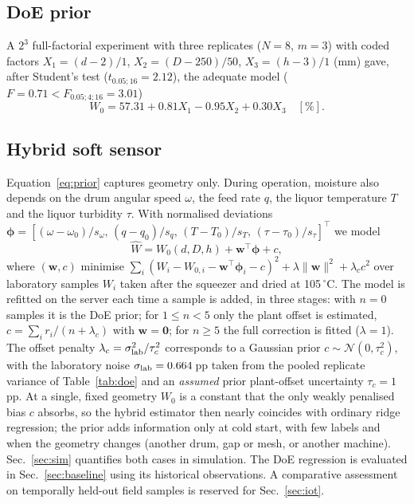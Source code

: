 \documentclass[journal]{IEEEtran}
\begin{document}
\subsection{DoE prior}
A $2^3$ full-factorial experiment with three replicates ($N=8$, $m=3$) with coded factors
$X_1=(d-2)/1$, $X_2=(D-250)/50$, $X_3=(h-3)/1$ (mm) gave, after Student's test ($t_{0.05;16}=2.12$), the adequate model
($F=0.71<F_{0.05;4;16}=3.01$)
\begin{equation}
W_0 = 57.31 + 0.81X_1 - 0.95X_2 + 0.30X_3 \quad [\%].
\label{eq:prior}
\end{equation}

\subsection{Hybrid soft sensor}
\label{sec:hybrid}
Equation~\eqref{eq:prior} captures geometry only. During operation, moisture also depends on the drum angular speed
$\omega$, the feed rate $q$, the liquor temperature $T$ and the liquor turbidity $\tau$. With normalised deviations
$\boldsymbol\phi=[(\omega-\omega_0)/s_\omega,\,(q-q_0)/s_q,\,(T-T_0)/s_T,\,(\tau-\tau_0)/s_\tau]^\top$ we model
\begin{equation}
\hat W = W_0(d,D,h) + \mathbf w^\top\boldsymbol\phi + c,
\end{equation}
where $(\mathbf w,c)$ minimise $\sum_i (W_i - W_{0,i} - \mathbf w^\top\boldsymbol\phi_i - c)^2 + \lambda\|\mathbf w\|^2
+ \lambda_c c^2$
over laboratory samples $W_i$ taken after the squeezer and dried at 105\,$^\circ$C. The model is refitted on the server
each time a sample is added, in three stages: with $n=0$ samples it is the DoE prior; for $1\le n<5$ only the plant
offset is estimated, $c=\sum_i r_i/(n+\lambda_c)$ with $\mathbf w=\mathbf 0$; for $n\ge5$ the full correction is
fitted ($\lambda=1$). The offset penalty $\lambda_c=\sigma_{\rm lab}^2/\tau_c^2$ corresponds to a Gaussian prior
$c\sim\mathcal N(0,\tau_c^2)$, with the laboratory noise $\sigma_{\rm lab}=0.664$\,pp taken from the pooled replicate
variance of Table~\ref{tab:doe} and an \emph{assumed} prior plant-offset uncertainty $\tau_c=1$\,pp.
At a single, fixed geometry $W_0$ is a constant that the only weakly penalised bias $c$ absorbs, so the hybrid
estimator then nearly coincides with ordinary ridge regression; the prior adds information only at cold start, with few
labels and when the geometry changes
(another drum, gap or mesh, or another machine). Sec.~\ref{sec:sim} quantifies both cases in simulation.
The DoE regression is evaluated in Sec.~\ref{sec:baseline} using its historical observations.
A comparative assessment on temporally held-out field samples is reserved for Sec.~\ref{sec:iot}.
\end{document}

